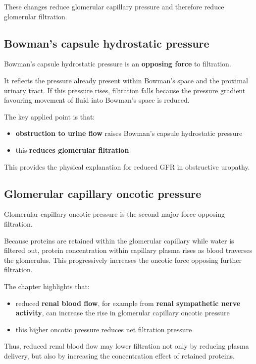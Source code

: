 \documentclass[11pt,a4paper]{article}
\begin{document}
These changes reduce glomerular capillary pressure and therefore reduce glomerular filtration.

\subsection{Bowman’s capsule hydrostatic pressure}

Bowman’s capsule hydrostatic pressure is an \textbf{opposing force} to filtration.

It reflects the pressure already present within Bowman’s space and the proximal urinary tract. If this pressure rises, filtration falls because the pressure gradient favouring movement of fluid into Bowman’s space is reduced.

The key applied point is that:
\begin{itemize}
    \item \textbf{obstruction to urine flow} raises Bowman’s capsule hydrostatic pressure
    \item this \textbf{reduces glomerular filtration}
\end{itemize}

This provides the physical explanation for reduced GFR in obstructive uropathy.

\subsection{Glomerular capillary oncotic pressure}

Glomerular capillary oncotic pressure is the second major force opposing filtration.

Because proteins are retained within the glomerular capillary while water is filtered out, protein concentration within capillary plasma rises as blood traverses the glomerulus. This progressively increases the oncotic force opposing further filtration.

The chapter highlights that:
\begin{itemize}
    \item reduced \textbf{renal blood flow}, for example from \textbf{renal sympathetic nerve activity}, can increase the rise in glomerular capillary oncotic pressure
    \item this higher oncotic pressure reduces net filtration pressure
\end{itemize}

Thus, reduced renal blood flow may lower filtration not only by reducing plasma delivery, but also by increasing the concentration effect of retained proteins.
\end{document}

